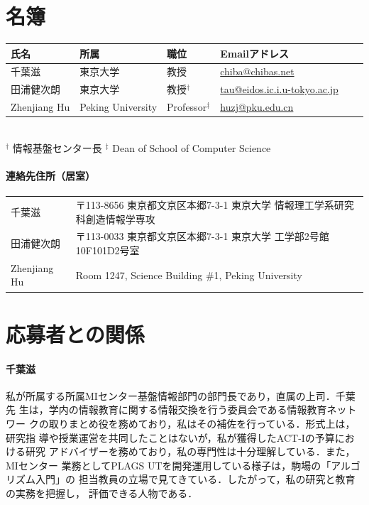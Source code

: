\documentclass[dvipdfmx]{jsarticle}
\begin{document}
\section*{名簿}
\begin{center}
\begin{tabular}[t]{llllll}
氏名 & 所属 & 職位 & Emailアドレス \\ \hline
千葉滋 & 東京大学 & 教授 & \url{chiba@chibas.net}  \\
田浦健次朗 & 東京大学 & 教授$^\dagger$ & \url{tau@eidos.ic.i.u-tokyo.ac.jp} \\
Zhenjiang Hu & Peking University & Professor$^\ddagger$ & \url{huzj@pku.edu.cn} \\
\end{tabular}
\medskip\\
\noindent
$^\dagger$ 情報基盤センター長
\qquad
\noindent
$^\ddagger$ Dean of School of Computer Science
\end{center}
\paragraph{連絡先住所（居室）}
\begin{center}
\begin{tabular}[t]{ll}
千葉滋 & 〒113-8656 東京都文京区本郷7-3-1 東京大学 情報理工学系研究科創造情報学専攻 \\
田浦健次朗 & 〒113-0033 東京都文京区本郷7-3-1 東京大学 工学部2号館10F101D2号室 \\
Zhenjiang Hu & Room 1247, Science Building \#1, Peking University \\
\end{tabular}
\end{center}

\section*{応募者との関係}
\paragraph{千葉滋}
私が所属する所属MIセンター基盤情報部門の部門長であり，直属の上司．千葉先
生は，学内の情報教育に関する情報交換を行う委員会である情報教育ネットワー
クの取りまとめ役を務めており，私はその補佐を行っている．形式上は，研究指
導や授業運営を共同したことはないが，私が獲得したACT-Iの予算における研究
アドバイザーを務めており，私の専門性は十分理解している．また，MIセンター
業務としてPLAGS UTを開発運用している様子は，駒場の「アルゴリズム入門」の
担当教員の立場で見てきている．したがって，私の研究と教育の実務を把握し，
評価できる人物である．
\end{document}
